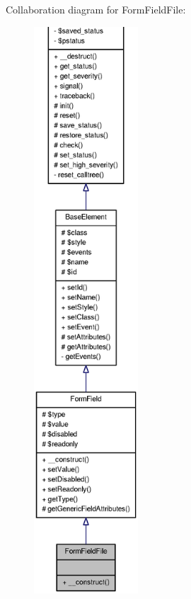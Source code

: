 Collaboration diagram for FormFieldFile:\nopagebreak
\begin{figure}[H]
\begin{center}
\leavevmode
\includegraphics[height=600pt]{classFormFieldFile__coll__graph}
\end{center}
\end{figure}
